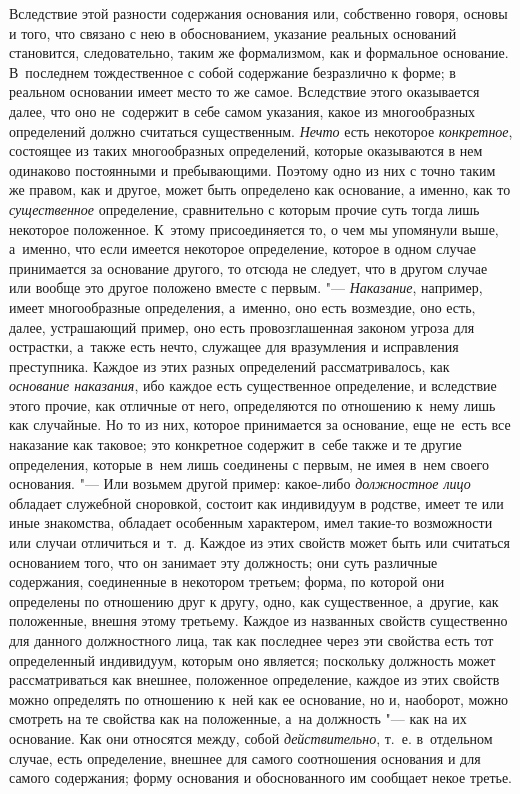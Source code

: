 Вследствие этой разности содержания основания или, собственно говоря, основы и
того, что связано с нею в обоснованием, указание реальных оснований становится,
следовательно, таким же формализмом, как и формальное основание. В~последнем
тождественное с собой содержание безразлично к форме; в реальном основании
имеет место то же самое. Вследствие этого оказывается далее, что оно
не~содержит в себе самом указания, какое из многообразных определений должно
считаться существенным. {\em Нечто} есть некоторое {\em конкретное}, состоящее
из таких многообразных определений, которые оказываются в нем одинаково
постоянными и пребывающими. Поэтому одно из них с точно таким же правом, как и
другое, может быть определено как основание, а именно, как то
{\em существенное} определение, сравнительно с которым прочие суть тогда лишь
некоторое положенное. К~этому присоединяется то, о чем мы упомянули выше,
а~именно, что если имеется некоторое определение, которое в одном случае
принимается за основание другого, то отсюда не следует, что в другом случае или
вообще это другое положено вместе с первым. "--- {\em Наказание}, например,
имеет многообразные определения, а~именно, оно есть возмездие, оно есть, далее,
устрашающий пример, оно есть провозглашенная законом угроза для острастки,
а~также есть нечто, служащее для вразумления и исправления преступника. Каждое
из этих разных определений рассматривалось, как {\em основание наказания}, ибо
каждое есть существенное определение, и вследствие этого прочие, как отличные
от него, определяются по отношению к~нему лишь как случайные. Но то из них,
которое принимается за основание, еще не~есть все наказание как таковое; это
конкретное содержит в~себе также и те другие определения, которые в~нем лишь
соединены с первым, не имея в~нем своего основания. "--- Или возьмем другой
пример: какое-либо {\em должностное лицо} обладает служебной сноровкой, состоит
как индивидуум в родстве, имеет те или иные знакомства, обладает особенным
характером, имел такие-то возможности или случаи отличиться и~т.~д. Каждое из
этих свойств может быть или считаться основанием того, что он занимает эту
должность; они суть различные содержания, соединенные в некотором третьем;
форма, по которой они определены по отношению друг к другу, одно, как
существенное, а~другие, как положенные, внешня этому третьему. Каждое из
названных свойств существенно для данного должностного лица, так как последнее
через эти свойства есть тот определенный индивидуум, которым оно является;
поскольку должность может рассматриваться как внешнее, положенное определение,
каждое из этих свойств можно определять по отношению к~ней как ее основание, но
и, наоборот, можно смотреть на те свойства как на положенные, а~на должность
"--- как на их основание. Как они относятся между, собой {\em действительно},
т.~е. в~отдельном случае, есть определение, внешнее для самого соотношения
основания и для самого содержания; форму основания и обоснованного им сообщает
некое третье.

